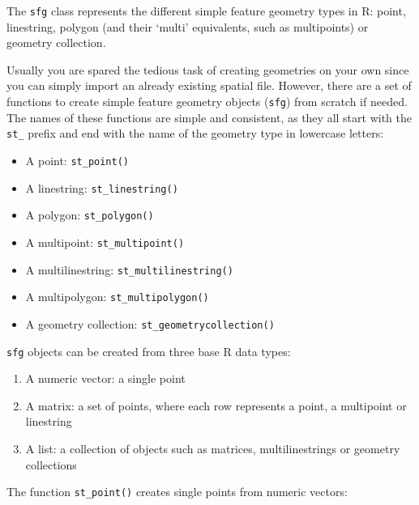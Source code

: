 \documentclass[]{krantz}
\providecommand{\tightlist}{%
  \setlength{\itemsep}{0pt}\setlength{\parskip}{0pt}}
\begin{document}
The \texttt{sfg} class represents the different simple feature geometry types in R: point, linestring, polygon (and their `multi' equivalents, such as multipoints) or geometry collection.

Usually you are spared the tedious task of creating geometries on your own since you can simply import an already existing spatial file.
However, there are a set of functions to create simple feature geometry objects (\texttt{sfg}) from scratch if needed.
The names of these functions are simple and consistent, as they all start with the \texttt{st\_} prefix and end with the name of the geometry type in lowercase letters:

\begin{itemize}
\tightlist
\item
  A point: \texttt{st\_point()}
\item
  A linestring: \texttt{st\_linestring()}
\item
  A polygon: \texttt{st\_polygon()}
\item
  A multipoint: \texttt{st\_multipoint()}
\item
  A multilinestring: \texttt{st\_multilinestring()}
\item
  A multipolygon: \texttt{st\_multipolygon()}
\item
  A geometry collection: \texttt{st\_geometrycollection()}
\end{itemize}

\texttt{sfg} objects can be created from three base R data types:

\begin{enumerate}
\def\labelenumi{\arabic{enumi}.}
\tightlist
\item
  A numeric vector: a single point
\item
  A matrix: a set of points, where each row represents a point, a multipoint or linestring
\item
  A list: a collection of objects such as matrices, multilinestrings or geometry collections
\end{enumerate}

The function \texttt{st\_point()} creates single points from numeric vectors:
\end{document}
